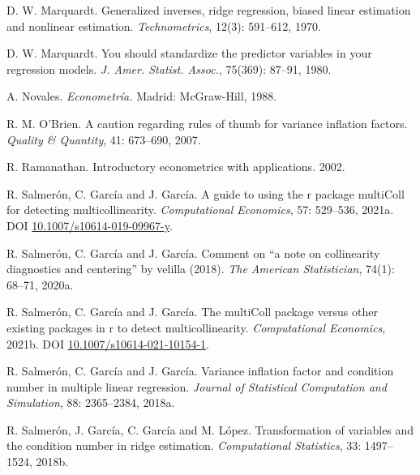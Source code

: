 \begin{CSLReferences}{1}{0}
\leavevmode{}%
D. W. Marquardt. {Generalized inverses, ridge regression, biased linear estimation and nonlinear estimation}. \emph{Technometrics}, 12(3): 591--612, 1970.

\leavevmode{}%
D. W. Marquardt. You should standardize the predictor variables in your regression models. \emph{J. Amer. Statist. Assoc.}, 75(369): 87--91, 1980.

\leavevmode{}%
A. Novales. \emph{{Econometría}.} Madrid: McGraw-Hill, 1988.

\leavevmode{}%
R. M. O'Brien. {A caution regarding rules of thumb for variance inflation factors}. \emph{Quality \& Quantity}, 41: 673--690, 2007.

\leavevmode{}%
R. Ramanathan. Introductory econometrics with applications. 2002.

\leavevmode{}%
R. Salmerón, C. García and J. García. A guide to using the r package multiColl for detecting multicollinearity. \emph{Computational Economics}, 57: 529--536, 2021a. DOI \href{https://doi.org/10.1007/s10614-019-09967-y}{10.1007/s10614-019-09967-y}.

\leavevmode{}%
R. Salmerón, C. García and J. García. Comment on {``a note on collinearity diagnostics and centering''} by velilla (2018). \emph{The American Statistician}, 74(1): 68--71, 2020a.

\leavevmode{}%
R. Salmerón, C. García and J. García. The multiColl package versus other existing packages in r to detect multicollinearity. \emph{Computational Economics}, 2021b. DOI \href{https://doi.org/10.1007/s10614-021-10154-1}{10.1007/s10614-021-10154-1}.

\leavevmode{}%
R. Salmerón, C. García and J. García. Variance inflation factor and condition number in multiple linear regression. \emph{Journal of Statistical Computation and Simulation}, 88: 2365--2384, 2018a.

\leavevmode{}%
R. Salmerón, J. García, C. García and M. López. Transformation of variables and the condition number in ridge estimation. \emph{Computational Statistics}, 33: 1497--1524, 2018b.


\end{CSLReferences}
